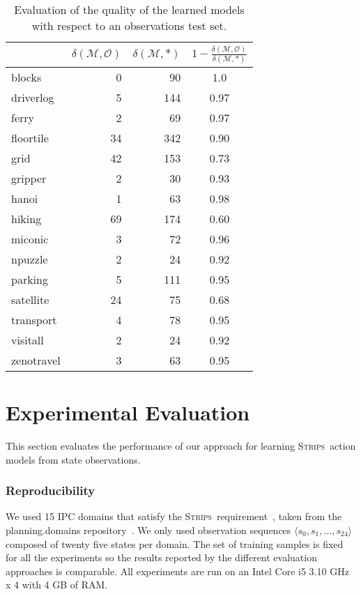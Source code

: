 \documentclass{article}
\newcommand{\tup}[1]{{\langle #1 \rangle}}
\newcommand{\strips}{\textsc{Strips}}     %
\begin{document}
\begin{table}
		\begin{center}
                \begin{footnotesize}
			\begin{tabular}{l|r|r|c|}
				& $\delta(\mathcal{M},\mathcal{O})$ & $\delta(\mathcal{M},*)$ & $1-\frac{\delta(\mathcal{M},\mathcal{O})}{\delta(\mathcal{M},*)}$ \\
				\hline
				blocks & 0 & 90 & 1.0 \\
				driverlog & 5 & 144 & 0.97 \\
				ferry & 2 & 69 & 0.97 \\
				floortile & 34 & 342 & 0.90 \\
				grid & 42 & 153 & 0.73 \\
				gripper & 2 & 30 & 0.93 \\
				hanoi & 1 & 63 & 0.98 \\
				hiking & 69 & 174 & 0.60 \\
				miconic & 3 & 72 & 0.96 \\
				npuzzle & 2 & 24 & 0.92 \\
				parking & 5 & 111 & 0.95 \\
				satellite & 24 & 75 & 0.68 \\
				transport & 4 & 78 & 0.95 \\
				visitall & 2 & 24 & 0.92 \\
				zenotravel & 3 & 63 & 0.95
			\end{tabular}
                        	\end{footnotesize}
		\end{center}
	\caption{\small Evaluation of the quality of the learned models with respect to an observations test set.}
	\label{fig:observationstest}
\end{table}

\section{Experimental Evaluation}
\label{experimental_evaluation}

This section evaluates the performance of our approach for learning \strips\ action models from state observations.

\subsubsection{Reproducibility}

We used 15 IPC domains that satisfy the \strips\ requirement~\cite{fox2003pddl2}, taken from the {\sc planning.domains} repository~\cite{muise2016planning}. We only used observation sequences $\tup{s_0, s_1, \ldots, s_{24}}$ composed of twenty five states per domain. The set of training samples is fixed for all the experiments so the results reported by the different evaluation approaches is comparable. All experiments are run on an Intel Core i5 3.10 GHz x 4 with 4 GB of RAM.
\end{document}
